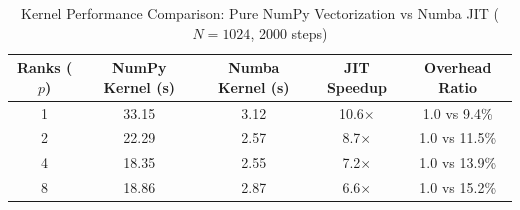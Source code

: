 \begin{table}[htbp]
\centering
\small
\caption{Kernel Performance Comparison: Pure NumPy Vectorization vs Numba JIT ($N=1024$, 2000 steps)}
\label{tab:kernel}
\begin{tabular}{ccccc}
\hline
\textbf{Ranks ($p$)} & \textbf{NumPy Kernel (s)} & \textbf{Numba Kernel (s)} & \textbf{JIT Speedup} & \textbf{Overhead Ratio} \\
\hline
1 & 33.15 & 3.12 & 10.6$\times$ & 1.0 vs 9.4\% \\
2 & 22.29 & 2.57 & 8.7$\times$ & 1.0 vs 11.5\% \\
4 & 18.35 & 2.55 & 7.2$\times$ & 1.0 vs 13.9\% \\
8 & 18.86 & 2.87 & 6.6$\times$ & 1.0 vs 15.2\% \\
\hline
\end{tabular}
\end{table}
